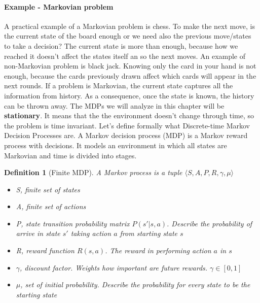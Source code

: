 \documentclass[main.tex]{subfiles}
\newtheorem{definition}{Definition}[section]
\begin{document}
\paragraph{Example - Markovian problem} A practical example of a Markovian problem is chess. To make the next move, is the current state of the board enough or we need also the previous move/states to take a decision? The current state is more than enough, because how we reached it doesn't affect the states itself an so the next moves. An example of non-Markovian problem is black jack. Knowing only the card in your hand is not enough, because the cards previously drawn affect which cards will appear in the next rounds.
\newline
\newline
If a problem is Markovian, the current state captures all the information from history. As a consequence, once the state is known, the history can be thrown away. The MDPs we will analyze in this chapter will be \textbf{stationary}\footnotemark. It means that the the environment doesn't change through time, so the problem is time invariant.
\newline
Let's define formally what Discrete-time Markov Decision Processes are.
A Markov decision process (MDP) is a Markov reward process with decisions. It models an environment in which all states are Markovian and time is divided into stages.
\newpage
\begin{definition}[Finite MDP]
    A Markov process is a tuple $\langle S, A, P, R, \gamma, \mu \rangle$
    \begin{itemize}
        \item S, finite set of states
        \item A, finite set of actions
        \item P, state transition probability matrix $P(s'|s,a)$. Describe the probability of arrive in state $s'$ taking action $a$ from starting state $s$
        \item R, reward function $R(s,a)$. The reward in performing action $a$ in $s$
        \item $\gamma$, discount factor. Weights how important are future rewards. $\gamma \in [0,1]$
        \item $\mu$, set of initial probability. Describe the probability for every state to be the starting state
    \end{itemize}
\end{definition}
\end{document}
